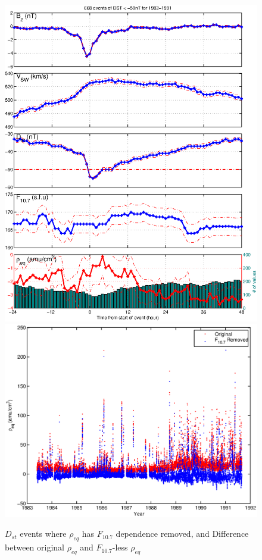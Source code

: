 \documentclass[10pt,twocolumn]{article}
\begin{document}
\begin{figure}[tp!]
\centering
\includegraphics[scale=0.40]{paperfigures/stormavs-dst-nof107.eps}
\includegraphics[scale=0.40]{paperfigures/f107removed.eps}
\caption{$D_{st}$ events where $\rho_{eq}$ has $F_{10.7}$ dependence removed, and Difference between original $\rho_{eq}$ and $F_{10.7}$-less $\rho_{eq}$}
\label{nof107}
\end{figure}
\end{document}
